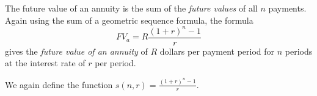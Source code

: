 \begin{definition}
    The future value of an annuity is the sum of the \emph{future values} of all \(n\) payments. Again using the sum of a geometric sequence formula, the formula
    \[FV_a = R  \frac{\left(1+r\right)^n-1}{r}\]
    gives the \emph{future value of an annuity} of \(R\) dollars per payment period for \(n\) periods at the interest rate of \(r\) per period.
\end{definition}

We again define the function \(s\left(n,r\right)=\frac{\left(1+r\right)^n-1}{r}.\)